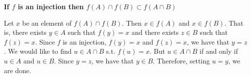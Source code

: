 \documentclass[a4paper,twoside,12pt]{article} %
\makeatletter
\DeclareRobustCommand{\_}{%
  \leavevmode\vbox{%
    \hrule\@width.4em
          \@height-.16ex
          \@depth\dimexpr.16ex+.28pt\relax}}
\makeatother
\begin{document}
{\begin{center} \large \textbf{If $f$ is an injection then $f(A)\cap f(B)\subset f(A\cap B)$}\end{center}}\nopagebreak[4]

\begin{center}
\begin{minipage}{120mm}
Let $x$ be an element of $f(A)\cap f(B)$. Then $x\in f(A)$ and $x\in f(B)$. That is, there exists $y\in A$ such that $f(y) = x$ and there exists $z\in B$ such that $f(z) = x$. Since $f$ is an injection, $f(y) = x$ and $f(z) = x$, we have that $y = z$. We would like to find $u\in A\cap B$ s.t. $f(u) = x$. But $u\in A\cap B$ if and only if $u\in A$ and $u\in B$. Since $y = z$, we have that $y\in B$. Therefore, setting $u = y$, we are done.
\end{minipage}
\end{center}
\end{document}
